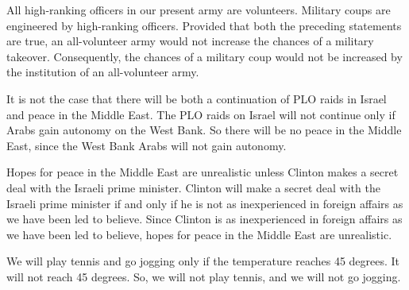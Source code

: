 \begin{enumerate}
\begin{statement} { All high-ranking officers in our present army are
    volunteers. Military coups are engineered by high-ranking officers. Provided
    that both the preceding statements are true, an all-volunteer army would not
    increase the chances of a military takeover. Consequently, the chances of a
    military coup would not be increased by the institution of an all-volunteer
    army.}
\end{statement}

\begin{statement} {It is not the case that there will be both a continuation of PLO raids in Israel
and peace in the Middle East. The PLO raids on Israel will not continue only if
Arabs gain autonomy on the West Bank. So there will be no peace in the Middle
East, since the West Bank Arabs will not gain autonomy.}
\end{statement}

\begin{statement} {Hopes for peace in the Middle East are unrealistic unless Clinton makes a secret
deal with the Israeli prime minister. Clinton will make a secret deal with the
Israeli prime minister if and only if he is not as inexperienced in foreign
affairs as we have been led to believe. Since Clinton is as inexperienced in
foreign affairs as we have been led to believe, hopes for peace in the Middle
East are unrealistic.}
\end{statement}

\begin{statement} {We will play tennis and go jogging only if the temperature
    reaches 45 degrees. It will not reach 45 degrees. So, we will not play
    tennis, and we will not go jogging.}
\end{statement}


\end{enumerate}
